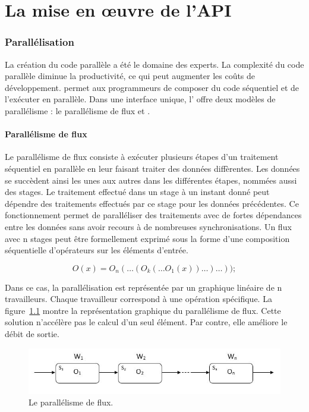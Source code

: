 
\chapter{La mise en \oe{}uvre de l'API}
\label{implementation.chap}

\subsection{Parall\'elisation}

La cr\'eation du code parall\`ele a \'et\'e le domaine des experts. La complexit\'e du code parall\`ele diminue la productivit\'e, ce qui peut augmenter les co\^uts de d\'eveloppement.  permet aux programmeurs de composer du code s\'equentiel et de l'ex\'ecuter en parall\`ele. Dans une interface unique, l' offre deux mod\`eles de parall\'elisme : le parall\'elisme de flux et .


\subsubsection{Parall\'elisme de flux}

Le parall\'elisme de flux consiste \`a ex\'ecuter plusieurs \'etapes d'un traitement s\'equentiel en parall\`ele en leur faisant traiter des données diff\`erentes. Les donn\'ees se succ\`edent ainsi les unes aux autres dans les diff\'erentes \'etapes, nomm\'ees aussi des stages. Le traitement effectu\'e dans un stage \`a un instant donn\'e peut d\'ependre des traitements effectu\'es par ce stage pour les donn\'ees pr\'ec\'edentes. Ce fonctionnement permet de parall\'eliser des traitements avec de fortes d\'ependances entre les donn\'ees sans avoir recours \`a de nombreuses synchronisations. 
Un flux avec n stages peut \^etre formellement exprim\'e sous la forme d'une composition s\'equentielle d'op\'erateurs sur les \'el\'ements d'entr\'ee. 

\[
	O(x) = O_n( \ldots (O_k( \ldots O_1(x)) \ldots ) \ldots ));
\]

Dans ce cas, la parall\'elisation est repr\'esent\'ee par un graphique lin\'eaire de n travailleurs. Chaque travailleur correspond \`a une op\'eration sp\'ecifique. La figure~\ref{ParallelismeDuFlux.fig} montre la repr\'esentation graphique du parall\'elisme de flux. Cette solution n'acc\'el\`ere pas le calcul d'un seul \'el\'ement. Par contre, elle am\'eliore le d\'ebit de sortie.

\begin{figure}[ht]
\centering
     \includegraphics[width=1.0\textwidth]{Figures/ParallelismeDuFlux.jpg}
      \caption{Le parall\'elisme de flux.}
       \label{ParallelismeDuFlux.fig}
\end{figure}



